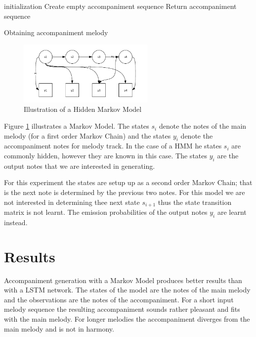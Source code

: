 \begin{algorithm}
 initialization\;
 Create empty accompaniment sequence\;
 Return accompaniment sequence\;
 \caption{Obtaining accompaniment melody}
\end{algorithm}


\begin{figure}
\centerline{\includegraphics[width=250px]{../images/hmm_illu.pdf}}
\caption{Illustration of a Hidden Markov Model}
\label{ims:hmm_illu}
\end{figure}

Figure \ref{ims:hmm_illu} illustrates a Markov Model. The states $s_i$ denote the notes of the main melody (for a first order Markov Chain) and the states $y_i$ denote the accompaniment notes for melody track. In the case of a \ac{HMM} he states $s_i$ are commonly hidden, however they are known in this case. The states $y_i$ are the output notes that we are interested in generating. 

For this experiment the states are setup up as a second order Markov Chain; that is the next note is determined by the previous two notes. For this model we are not interested in determining thee next state $s_{i+1}$ thus the state transition matrix is not learnt. The emission probabilities of the output notes $y_i$ are learnt instead.


\section{Results}
Accompaniment generation with a Markov Model produces better results than with a \ac{LSTM} network. The states of the model are the notes of the main melody and the observations are the notes of the accompaniment. For a short input melody sequence the resulting accompaniment sounds rather pleasant and fits with the main melody. For longer melodies the accompaniment diverges from the main melody and is not in harmony.

